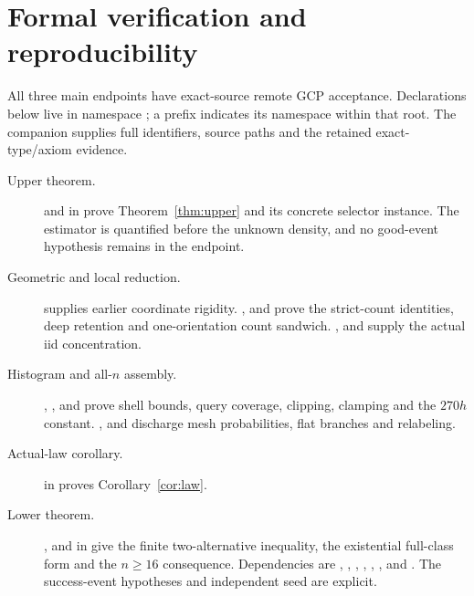 \documentclass[11pt]{article}
\theoremstyle{remark}
\begin{document}
\section{Formal verification and reproducibility}
\label{sec:formal}
All three main endpoints have exact-source remote GCP acceptance.
Declarations below live in namespace ; a prefix
 indicates its namespace within that root.
The companion  supplies full identifiers, source
paths and the retained exact-type/axiom evidence.

\begin{description}
\item[Upper theorem.]
 and
 in
 prove Theorem~\ref{thm:upper} and its
concrete selector instance. The estimator is quantified before the
unknown density, and no good-event hypothesis remains in the endpoint.
\item[Geometric and local reduction.]
 supplies earlier coordinate rigidity.
,  and
 prove the strict-count identities,
deep retention and one-orientation count sandwich.
,  and
 supply the actual iid concentration.
\item[Histogram and all-$n$ assembly.]
, ,
 and  prove
shell bounds, query coverage, clipping, clamping and the $270h$ constant.
,
 and  discharge
mesh probabilities, flat branches and relabeling.
\item[Actual-law corollary.]
 in
 proves Corollary~\ref{cor:law}.
\item[Lower theorem.]
,
 and
 in 
give the finite two-alternative inequality, the existential full-class
form and the $n\ge16$ consequence. Dependencies are
, ,
, ,
, ,
 and .
The success-event hypotheses and independent seed are explicit.
\end{description}
\end{document}
